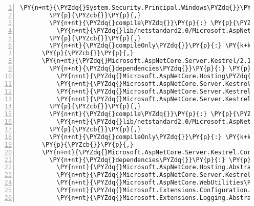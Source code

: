 \begin{Verbatim}[commandchars=\\\{\},numbers=left,firstnumber=1,stepnumber=1,numberblanklines=0]
          \PY{n+nt}{\PYZdq{}System.Security.Principal.Windows\PYZdq{}}\PY{p}{:} \PY{l+s+s2}{\PYZdq{}4.5.0\PYZhy{}rc1\PYZdq{}}
        \PY{p}{\PYZcb{}}\PY{p}{,}
        \PY{n+nt}{\PYZdq{}compile\PYZdq{}}\PY{p}{:} \PY{p}{\PYZob{}}
          \PY{n+nt}{\PYZdq{}lib/netstandard2.0/Microsoft.AspNetCore.Server.IISIntegration.dll\PYZdq{}}\PY{p}{:} \PY{p}{\PYZob{}}\PY{p}{\PYZcb{}}
        \PY{p}{\PYZcb{}}\PY{p}{,}
        \PY{n+nt}{\PYZdq{}compileOnly\PYZdq{}}\PY{p}{:} \PY{k+kc}{true}
      \PY{p}{\PYZcb{}}\PY{p}{,}
      \PY{n+nt}{\PYZdq{}Microsoft.AspNetCore.Server.Kestrel/2.1.0\PYZhy{}rc1\PYZhy{}final\PYZdq{}}\PY{p}{:} \PY{p}{\PYZob{}}
        \PY{n+nt}{\PYZdq{}dependencies\PYZdq{}}\PY{p}{:} \PY{p}{\PYZob{}}
          \PY{n+nt}{\PYZdq{}Microsoft.AspNetCore.Hosting\PYZdq{}}\PY{p}{:} \PY{l+s+s2}{\PYZdq{}2.1.0\PYZhy{}rc1\PYZhy{}final\PYZdq{}}\PY{p}{,}
          \PY{n+nt}{\PYZdq{}Microsoft.AspNetCore.Server.Kestrel.Core\PYZdq{}}\PY{p}{:} \PY{l+s+s2}{\PYZdq{}2.1.0\PYZhy{}rc1\PYZhy{}final\PYZdq{}}\PY{p}{,}
          \PY{n+nt}{\PYZdq{}Microsoft.AspNetCore.Server.Kestrel.Https\PYZdq{}}\PY{p}{:} \PY{l+s+s2}{\PYZdq{}2.1.0\PYZhy{}rc1\PYZhy{}final\PYZdq{}}\PY{p}{,}
          \PY{n+nt}{\PYZdq{}Microsoft.AspNetCore.Server.Kestrel.Transport.Sockets\PYZdq{}}\PY{p}{:} \PY{l+s+s2}{\PYZdq{}2.1.0\PYZhy{}rc1\PYZhy{}final\PYZdq{}}
        \PY{p}{\PYZcb{}}\PY{p}{,}
        \PY{n+nt}{\PYZdq{}compile\PYZdq{}}\PY{p}{:} \PY{p}{\PYZob{}}
          \PY{n+nt}{\PYZdq{}lib/netstandard2.0/Microsoft.AspNetCore.Server.Kestrel.dll\PYZdq{}}\PY{p}{:} \PY{p}{\PYZob{}}\PY{p}{\PYZcb{}}
        \PY{p}{\PYZcb{}}\PY{p}{,}
        \PY{n+nt}{\PYZdq{}compileOnly\PYZdq{}}\PY{p}{:} \PY{k+kc}{true}
      \PY{p}{\PYZcb{}}\PY{p}{,}
      \PY{n+nt}{\PYZdq{}Microsoft.AspNetCore.Server.Kestrel.Core/2.1.0\PYZhy{}rc1\PYZhy{}final\PYZdq{}}\PY{p}{:} \PY{p}{\PYZob{}}
        \PY{n+nt}{\PYZdq{}dependencies\PYZdq{}}\PY{p}{:} \PY{p}{\PYZob{}}
          \PY{n+nt}{\PYZdq{}Microsoft.AspNetCore.Hosting.Abstractions\PYZdq{}}\PY{p}{:} \PY{l+s+s2}{\PYZdq{}2.1.0\PYZhy{}rc1\PYZhy{}final\PYZdq{}}\PY{p}{,}
          \PY{n+nt}{\PYZdq{}Microsoft.AspNetCore.Server.Kestrel.Transport.Abstractions\PYZdq{}}\PY{p}{:} \PY{l+s+s2}{\PYZdq{}2.1.0\PYZhy{}rc1\PYZhy{}final\PYZdq{}}\PY{p}{,}
          \PY{n+nt}{\PYZdq{}Microsoft.AspNetCore.WebUtilities\PYZdq{}}\PY{p}{:} \PY{l+s+s2}{\PYZdq{}2.1.0\PYZhy{}rc1\PYZhy{}final\PYZdq{}}\PY{p}{,}
          \PY{n+nt}{\PYZdq{}Microsoft.Extensions.Configuration.Binder\PYZdq{}}\PY{p}{:} \PY{l+s+s2}{\PYZdq{}2.1.0\PYZhy{}rc1\PYZhy{}final\PYZdq{}}\PY{p}{,}
          \PY{n+nt}{\PYZdq{}Microsoft.Extensions.Logging.Abstractions\PYZdq{}}\PY{p}{:} \PY{l+s+s2}{\PYZdq{}2.1.0\PYZhy{}rc1\PYZhy{}final\PYZdq{}}\PY{p}{,}

\end{Verbatim}
